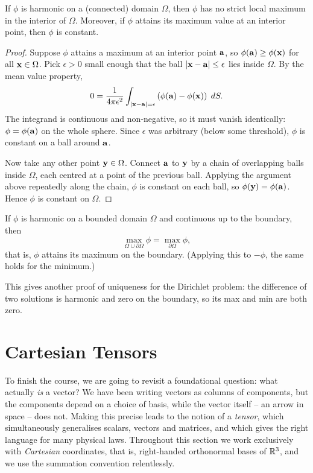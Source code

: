 \documentclass[a4paper]{scrartcl}
\begin{document}
\begin{theorem}
	If $\phi$ is harmonic on a (connected) domain $\Omega$, then $\phi$ has no strict local maximum in the interior of $\Omega$. Moreover, if $\phi$ attains its maximum value at an interior point, then $\phi$ is constant.
\end{theorem}
\begin{proof}
	Suppose $\phi$ attains a maximum at an interior point $\mathbf{a}$, so $\phi(\mathbf{a}) \geq \phi(\mathbf{x})$ for all $\mathbf{x} \in \Omega$. Pick $\epsilon > 0$ small enough that the ball $|\mathbf{x} - \mathbf{a}| \leq \epsilon$ lies inside $\Omega$. By the mean value property,
	$$
	0 = \frac{1}{4 \pi \epsilon^2}\int_{|\mathbf{x} - \mathbf{a}| = \epsilon} \left(\phi(\mathbf{a}) - \phi(\mathbf{x})\right) \; d S.
	$$
	The integrand is continuous and non-negative, so it must vanish identically: $\phi = \phi(\mathbf{a})$ on the whole sphere. Since $\epsilon$ was arbitrary (below some threshold), $\phi$ is constant on a ball around $\mathbf{a}$.

	Now take any other point $\mathbf{y} \in \Omega$. Connect $\mathbf{a}$ to $\mathbf{y}$ by a chain of overlapping balls inside $\Omega$, each centred at a point of the previous ball. Applying the argument above repeatedly along the chain, $\phi$ is constant on each ball, so $\phi(\mathbf{y}) = \phi(\mathbf{a})$. Hence $\phi$ is constant on $\Omega$.
\end{proof}

\begin{corollary}
	If $\phi$ is harmonic on a bounded domain $\Omega$ and continuous up to the boundary, then
	$$
	\max_{\Omega \cup \partial \Omega} \phi = \max_{\partial \Omega} \phi,
	$$
	that is, $\phi$ attains its maximum on the boundary. (Applying this to $-\phi$, the same holds for the minimum.)
\end{corollary}

This gives another proof of uniqueness for the Dirichlet problem: the difference of two solutions is harmonic and zero on the boundary, so its max and min are both zero.
\section{Cartesian Tensors}

To finish the course, we are going to revisit a foundational question: what actually \emph{is} a vector? We have been writing vectors as columns of components, but the components depend on a choice of basis, while the vector itself -- an arrow in space -- does not. Making this precise leads to the notion of a \emph{tensor}, which simultaneously generalises scalars, vectors and matrices, and which gives the right language for many physical laws. Throughout this section we work exclusively with \emph{Cartesian} coordinates, that is, right-handed orthonormal bases of $\mathbb{R}^3$, and we use the summation convention relentlessly.
\end{document}
